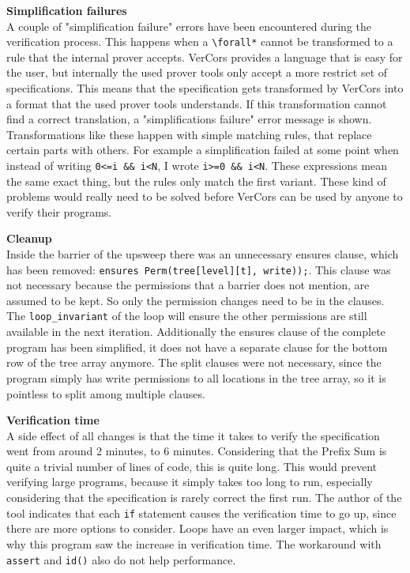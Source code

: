 \documentclass[a4paper]{article}
\newcommand{\code}[1]{\texttt{\small \color{inline}#1}} %
\begin{document}
\textbf{Simplification failures}\\
A couple of "simplification failure" errors have been encountered during the verification process. This happens when a \code{\textbackslash forall*} cannot be transformed to a rule that the internal prover accepts. VerCors provides a language that is easy for the user, but internally the used prover tools only accept a more restrict set of specifications. This means that the specification gets transformed by VerCors into a format that the used prover tools understands. If this transformation cannot find a correct translation, a "simplifications failure" error message is shown. Transformations like these happen with simple matching rules, that replace certain parts with others. For example a simplification failed at some point when instead of writing \code{0<=i \&\& i<N}, I wrote \code{i>=0 \&\& i<N}. These expressions mean the same exact thing, but the rules only match the first variant. These kind of problems would really need to be solved before VerCors can be used by anyone to verify their programs.

\textbf{Cleanup}\\
Inside the barrier of the upsweep there was an unnecessary ensures clause, which has been removed: \code{ensures Perm(tree[level][t], write));}. This clause was not necessary because the permissions that a barrier does not mention, are assumed to be kept. So only the permission changes need to be in the clauses. The \code{loop\_invariant} of the loop will ensure the other permissions are still available in the next iteration.
Additionally the ensures clause of the complete program has been simplified, it does not have a separate clause for the bottom row of the tree array anymore. The split clauses were not necessary, since the program simply has write permissions to all locations in the tree array, so it is pointless to split among multiple clauses.

\textbf{Verification time}\\
A side effect of all changes is that the time it takes to verify the specification went from around 2 minutes, to 6 minutes. Considering that the Prefix Sum is quite a trivial number of lines of code, this is quite long. This would prevent verifying large programs, because it simply takes too long to run, especially considering that the specification is rarely correct the first run. The author of the tool indicates that each \code{if} statement causes the verification time to go up, since there are more options to consider. Loops have an even larger impact, which is why this program saw the increase in verification time. The workaround with \code{assert} and \code{id()} also do not help performance.
\end{document}
